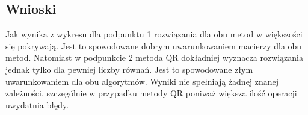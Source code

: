 \documentclass[a4paper, 11pt]{article}
\begin{document}
\vspace{10cm}
\subsection{Wnioski}
Jak wynika z wykresu dla podpunktu 1 rozwiązania dla obu metod w większości się pokrywają. Jest to spowodowane dobrym uwarunkowaniem macierzy dla obu metod. Natomiast w podpunkcie 2 metoda QR dokładniej wyznacza rozwiązania 
jednak tylko dla pewniej liczby równań. Jest to spowodowane złym uwarunkowaniem dla obu algorytmów. Wyniki nie spełniają żadnej znanej zależności, szczególnie w przypadku metody QR poniważ większa ilość operacji uwydatnia błędy. 


	
\end{document}
